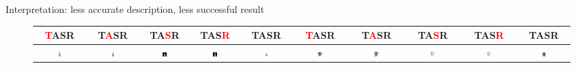 \documentclass[10pt]{beamer}
\newcommand{\tc}[1]{\textcolor{red}{#1}}
\begin{document}
\begin{frame}{Interpretation: less accurate description, less successful result}

\addtolength{\tabcolsep}{-6pt}
\begin{figure}
\centering
\begin{tabular}{*{5}{c}|*{5}{c}}
\tc{T}ASR & T\tc{A}SR & TA\tc{S}R & TAS\tc{R} & TASR & \tc{T}ASR & T\tc{A}SR & TA\tc{S}R & TAS\tc{R} & TASR \\
\midrule
\includegraphics[width=0.1\textwidth]{interp/synth_interp/vase0_mvs} &
\includegraphics[width=0.1\textwidth]{interp/synth_interp/vase0_vh} &
\includegraphics[width=0.1\textwidth]{interp/synth_interp/vase0_sl} &
\includegraphics[width=0.1\textwidth]{interp/synth_interp/vase0_sl} &
\includegraphics[width=0.1\textwidth]{interp/synth_interp/vase0_ps} &
\includegraphics[width=0.1\textwidth]{interp/real_interp/cup/cup_mvs} &
\includegraphics[width=0.1\textwidth]{interp/real_interp/cup/cup_sc} &
\includegraphics[width=0.1\textwidth]{interp/real_interp/cup/cup_sl} &
\includegraphics[width=0.1\textwidth]{interp/real_interp/cup/cup_sl} &
\includegraphics[width=0.1\textwidth]{interp/real_interp/cup/cup_ps} \\


\end{tabular}
\end{figure}
\end{frame}
\end{document}
